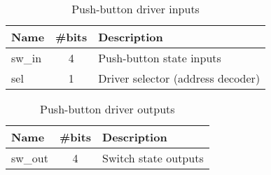 \begin{table}[h!]
    \centering
    \caption{Push-button driver inputs}
    \label{tab:pshIn}
    \begin{tabular}{@{}lcl@{}}
    \toprule
    Name   & \multicolumn{1}{l}{\#bits} & Description                       \\ \midrule
    sw\_in & 4                          & Push-button state inputs              \\
    sel    & 1                          & Driver selector (address decoder) \\ \bottomrule
    \end{tabular}
    \end{table}

\begin{table}[h!]
    \centering
    \caption{Push-button driver outputs}
    \label{tab:pshOut}
    \begin{tabular}{@{}lll@{}}
    \toprule
    Name    & \#bits                & Description          \\ \midrule
    sw\_out & \multicolumn{1}{c}{4} & Switch state outputs
    \end{tabular}
    \end{table}

